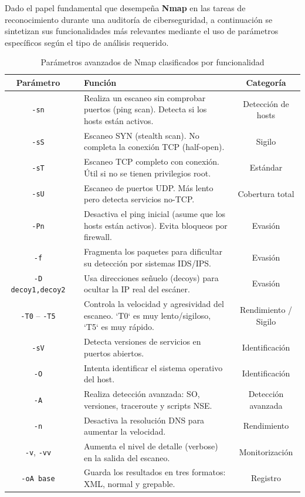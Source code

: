 \documentclass[a4paper, 11pt]{article}
\begin{document}
Dado el papel fundamental que desempeña \textbf{Nmap} en las tareas de reconocimiento durante una auditoría de ciberseguridad, a continuación se sintetizan sus funcionalidades más relevantes mediante el uso de parámetros específicos según el tipo de análisis requerido.

\vspace{1em}

\begin{table}[H]
\centering
\renewcommand{\arraystretch}{1.3}
\begin{tabularx}{\textwidth}{clXc}
\toprule
\textbf{Parámetro} & \textbf{} & \textbf{Función} & \textbf{Categoría} \\
\midrule
\bottomrule
\texttt{-sn} & & Realiza un escaneo sin comprobar puertos (ping scan). Detecta si los hosts están activos. & Detección de hosts \\
\bottomrule
\texttt{-sS} & & Escaneo SYN (stealth scan). No completa la conexión TCP (half-open). & Sigilo \\
\bottomrule
\texttt{-sT} & & Escaneo TCP completo con conexión. Útil si no se tienen privilegios root. & Estándar \\
\bottomrule
\texttt{-sU} & & Escaneo de puertos UDP. Más lento pero detecta servicios no-TCP. & Cobertura total \\
\bottomrule
\texttt{-Pn} & & Desactiva el ping inicial (asume que los hosts están activos). Evita bloqueos por firewall. & Evasión \\
\bottomrule
\texttt{-f}  & & Fragmenta los paquetes para dificultar su detección por sistemas IDS/IPS. & Evasión \\
\bottomrule
\texttt{-D decoy1,decoy2} & & Usa direcciones señuelo (decoys) para ocultar la IP real del escáner. & Evasión \\
\bottomrule
\texttt{-T0} -- \texttt{-T5} & & Controla la velocidad y agresividad del escaneo. `T0` es muy lento/sigiloso, `T5` es muy rápido. & Rendimiento / Sigilo \\
\bottomrule
\texttt{-sV} & & Detecta versiones de servicios en puertos abiertos. & Identificación \\
\bottomrule
\texttt{-O} & & Intenta identificar el sistema operativo del host. & Identificación \\
\bottomrule
\texttt{-A} & & Realiza detección avanzada: SO, versiones, traceroute y scripts NSE. & Detección avanzada \\
\bottomrule
\texttt{-n} & & Desactiva la resolución DNS para aumentar la velocidad. & Rendimiento \\
\bottomrule
\texttt{-v}, \texttt{-vv} & & Aumenta el nivel de detalle (verbose) en la salida del escaneo. & Monitorización \\
\bottomrule
\texttt{-oA base} & & Guarda los resultados en tres formatos: XML, normal y grepable. & Registro \\
\bottomrule
\end{tabularx}
\caption{Parámetros avanzados de Nmap clasificados por funcionalidad}
\label{tab:nmap_avanzado}
\end{table}
\end{document}
